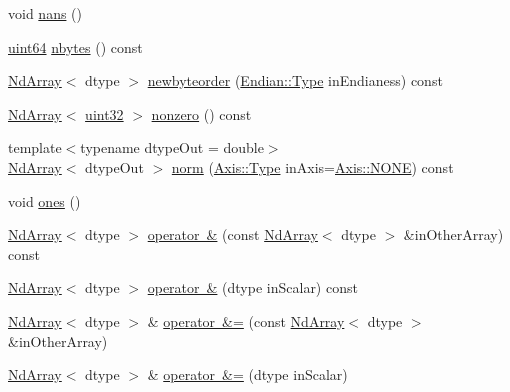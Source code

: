 \begin{DoxyCompactItemize}
\item 
void \mbox{\hyperlink{class_num_cpp_1_1_nd_array_a744e2b25b36ddeac6b1495068bf298d6}{nans}} ()
\item 
\mbox{\hyperlink{namespace_num_cpp_a9b8a75722198a622843adfb37b1b2e9d}{uint64}} \mbox{\hyperlink{class_num_cpp_1_1_nd_array_a0f15ef17ca8da31ee188b2c20801243c}{nbytes}} () const
\item 
\mbox{\hyperlink{class_num_cpp_1_1_nd_array}{Nd\+Array}}$<$ dtype $>$ \mbox{\hyperlink{class_num_cpp_1_1_nd_array_a206fe78f40f2ba05babcddc00a55258a}{newbyteorder}} (\mbox{\hyperlink{struct_num_cpp_1_1_endian_a4b4f3e02f68302be202402f5d5501445}{Endian\+::\+Type}} in\+Endianess) const
\item 
\mbox{\hyperlink{class_num_cpp_1_1_nd_array}{Nd\+Array}}$<$ \mbox{\hyperlink{namespace_num_cpp_a36f388e948380413c63011cab9b7fbd5}{uint32}} $>$ \mbox{\hyperlink{class_num_cpp_1_1_nd_array_af89d5c6a51185acc64afdfff66f0d786}{nonzero}} () const
\item 
{\footnotesize template$<$typename dtype\+Out  = double$>$ }\\\mbox{\hyperlink{class_num_cpp_1_1_nd_array}{Nd\+Array}}$<$ dtype\+Out $>$ \mbox{\hyperlink{class_num_cpp_1_1_nd_array_a5d84832ed56a4908f45533a1f6663b3c}{norm}} (\mbox{\hyperlink{struct_num_cpp_1_1_axis_ac10eb76f8631762d9ed70c40c42ca6cb}{Axis\+::\+Type}} in\+Axis=\mbox{\hyperlink{struct_num_cpp_1_1_axis_ac10eb76f8631762d9ed70c40c42ca6cba747ae657022cca1d87702b56d0c038e9}{Axis\+::\+N\+O\+NE}}) const
\item 
void \mbox{\hyperlink{class_num_cpp_1_1_nd_array_a66c340aa91606a937186a1f9f5b6c4cf}{ones}} ()
\item 
\mbox{\hyperlink{class_num_cpp_1_1_nd_array}{Nd\+Array}}$<$ dtype $>$ \mbox{\hyperlink{class_num_cpp_1_1_nd_array_affb2d174578a36e5f3d87df2bfe3522a}{operator \&}} (const \mbox{\hyperlink{class_num_cpp_1_1_nd_array}{Nd\+Array}}$<$ dtype $>$ \&in\+Other\+Array) const
\item 
\mbox{\hyperlink{class_num_cpp_1_1_nd_array}{Nd\+Array}}$<$ dtype $>$ \mbox{\hyperlink{class_num_cpp_1_1_nd_array_a60a4f9c8d912bb3d5129e561d8ddd847}{operator \&}} (dtype in\+Scalar) const
\item 
\mbox{\hyperlink{class_num_cpp_1_1_nd_array}{Nd\+Array}}$<$ dtype $>$ \& \mbox{\hyperlink{class_num_cpp_1_1_nd_array_ae5778250ad10187826c880f9de361c03}{operator \&=}} (const \mbox{\hyperlink{class_num_cpp_1_1_nd_array}{Nd\+Array}}$<$ dtype $>$ \&in\+Other\+Array)
\item 
\mbox{\hyperlink{class_num_cpp_1_1_nd_array}{Nd\+Array}}$<$ dtype $>$ \& \mbox{\hyperlink{class_num_cpp_1_1_nd_array_ab7f8c1331eadc36d0260015a1e5cf26a}{operator \&=}} (dtype in\+Scalar)

\end{DoxyCompactItemize}
